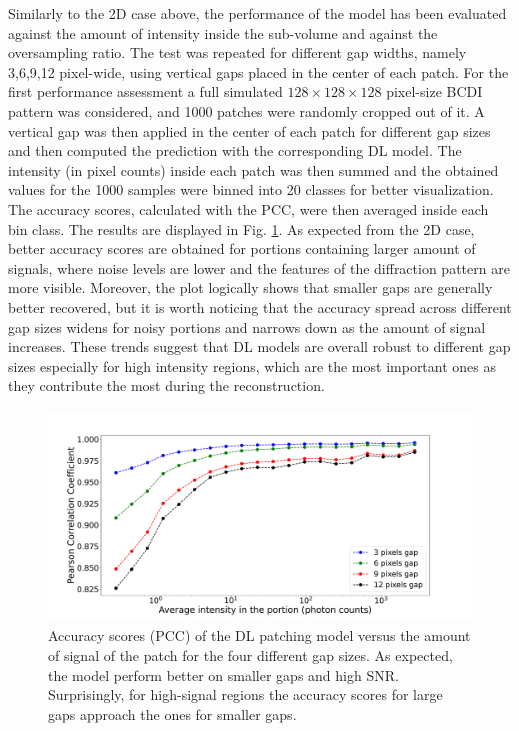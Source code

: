 Similarly to the 2D case above, the performance of the model has been evaluated against the amount of intensity 
inside the sub-volume and against the oversampling ratio. The test was repeated for different gap widths, namely 3,6,9,12 
pixel-wide, using vertical gaps placed in the center of each patch. 
For the first performance assessment a full simulated $128\times128\times128$ pixel-size BCDI pattern was considered, 
and 1000 patches were randomly cropped out of it. A vertical gap was then applied in the center of each patch for different 
gap sizes and then computed the prediction with the corresponding DL model. The intensity (in pixel counts) inside each patch 
was then summed and the obtained values for the 1000 samples were binned into 20 classes for better visualization. 
The accuracy scores, calculated with the PCC, were then averaged inside each bin class. The results are displayed in Fig. 
\ref{fig:acc_int_3D}. As expected from the 2D case, better accuracy scores are obtained for portions
containing larger amount of signals, where noise levels are lower and the features of the diffraction pattern are more 
visible. Moreover, the plot logically shows that smaller gaps are generally better recovered, but it is worth noticing
that the accuracy spread across different gap sizes widens for noisy portions and narrows down as the amount of signal 
increases. These trends suggest that DL models are overall robust to different gap sizes especially for high intensity regions, 
which are the most important ones as they contribute the most during the reconstruction. 

\begin{figure}[H]
    \centering
    \includegraphics[width=\textwidth]{figures/Inpainting/1D_Acc_Intensity.pdf}
    \caption{Accuracy scores (PCC) of the DL patching model versus the amount of signal of the patch for the four different 
    gap sizes. As expected, the model perform better on smaller gaps and high SNR. Surprisingly, for high-signal regions 
    the accuracy scores for large gaps approach the ones for smaller gaps.}
    \label{fig:acc_int_3D}
\end{figure}

